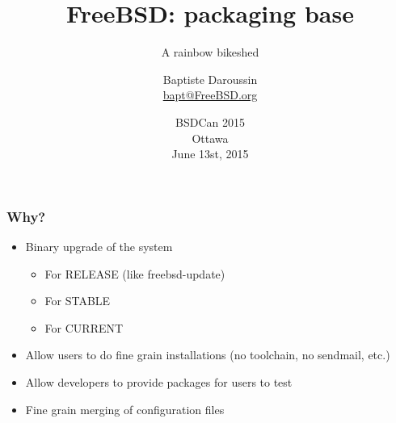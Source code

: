 
\usepackage{color}
\usepackage{listings}
\newcommand{\prestitle}{BSDCan 2015}
\lstset{
	numbers=none,
	frame=l,
	aboveskip=0pt, belowskip=0pt
}

\title{FreeBSD: packaging base}
\subtitle{A rainbow bikeshed}
\author{Baptiste Daroussin \\ \url{bapt@FreeBSD.org}}
\date{BSDCan 2015 \\ Ottawa \\ June 13st, 2015}


\begin{frame}[plain]
	\titlepage
\end{frame}

\begin{frame}
	\frametitle{Why?}
	\begin{itemize}
		\item Binary upgrade of the system
			\begin{itemize}
				\item For RELEASE (like freebsd-update)
				\item For STABLE
				\item For CURRENT
			\end{itemize}
		\item Allow users to do fine grain installations (no toolchain, no sendmail, etc.)
		\item Allow developers to provide packages for users to test
		\item Fine grain merging of configuration files
	\end{itemize}
\end{frame}

